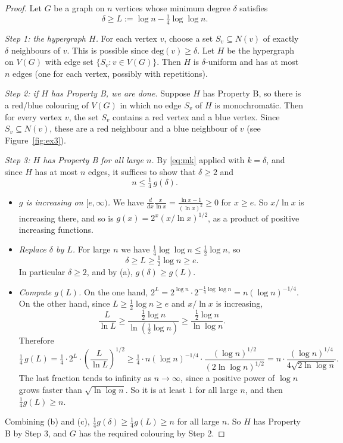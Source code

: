 \documentclass[a4paper,12pt]{article}
\renewcommand{\deg}{\textrm{deg}}
\begin{document}
\begin{proof}
	Let $G$ be a graph on $n$ vertices whose minimum degree $\delta$ satisfies
	\[
		\delta \ge L := \log n - \tfrac14 \log\log n.
	\]

	\emph{Step 1: the hypergraph $H$.} For each vertex $v$, choose a set $S_v \subseteq N(v)$ of exactly $\delta$ neighbours of $v$. This is possible since $\deg(v) \ge \delta$. Let $H$ be the hypergraph on $V(G)$ with edge set $\{ S_v : v \in V(G) \}$. Then $H$ is $\delta$-uniform and has at most $n$ edges (one for each vertex, possibly with repetitions).

	\emph{Step 2: if $H$ has Property B, we are done.} Suppose $H$ has Property B, so there is a red/blue colouring of $V(G)$ in which no edge $S_v$ of $H$ is monochromatic. Then for every vertex $v$, the set $S_v$ contains a red vertex and a blue vertex. Since $S_v \subseteq N(v)$, these are a red neighbour and a blue neighbour of $v$ (see Figure~\ref{fig:ex3}).

	\emph{Step 3: $H$ has Property B for all large $n$.} By \eqref{eq:mk} applied with $k = \delta$, and since $H$ has at most $n$ edges, it suffices to show that $\delta \ge 2$ and
	\[
		n \le \tfrac14\, g(\delta).
	\]
	\begin{itemize}
		\item[(a)] \emph{$g$ is increasing on $[e, \infty)$.} We have $\frac{d}{dx} \frac{x}{\ln x} = \frac{\ln x - 1}{(\ln x)^2} \ge 0$ for $x \ge e$. So $x / \ln x$ is increasing there, and so is $g(x) = 2^x (x/\ln x)^{1/2}$, as a product of positive increasing functions.
		\item[(b)] \emph{Replace $\delta$ by $L$.} For large $n$ we have $\frac14 \log\log n \le \frac12 \log n$, so
		\[
			\delta \ge L \ge \tfrac12 \log n \ge e.
		\]
		In particular $\delta \ge 2$, and by (a), $g(\delta) \ge g(L)$.
		\item[(c)] \emph{Compute $g(L)$.} On the one hand, $2^L = 2^{\log n} \cdot 2^{-\frac14 \log\log n} = n (\log n)^{-1/4}$. On the other hand, since $L \ge \frac12 \log n \ge e$ and $x / \ln x$ is increasing,
		\[
			\frac{L}{\ln L} \ge \frac{\frac12 \log n}{\ln\left( \frac12 \log n \right)} \ge \frac{\frac12 \log n}{\ln \log n}.
		\]
		Therefore
		\[
			\tfrac14\, g(L) = \tfrac14 \cdot 2^L \cdot \left( \frac{L}{\ln L} \right)^{1/2} \ge \tfrac14 \cdot n (\log n)^{-1/4} \cdot \frac{(\log n)^{1/2}}{(2 \ln \log n)^{1/2}} = n \cdot \frac{(\log n)^{1/4}}{4 \sqrt{2 \ln \log n}}.
		\]
		The last fraction tends to infinity as $n \to \infty$, since a positive power of $\log n$ grows faster than $\sqrt{\ln \log n}$. So it is at least $1$ for all large $n$, and then $\frac14 g(L) \ge n$.
	\end{itemize}
	Combining (b) and (c), $\frac14 g(\delta) \ge \frac14 g(L) \ge n$ for all large $n$. So $H$ has Property B by Step 3, and $G$ has the required colouring by Step 2.
\end{proof}
\end{document}
